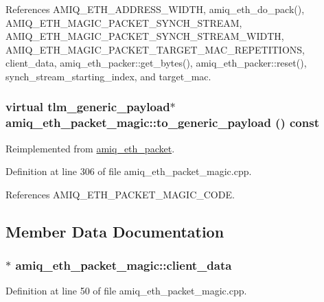 References AMIQ\_\-ETH\_\-ADDRESS\_\-WIDTH, amiq\_\-eth\_\-do\_\-pack(), AMIQ\_\-ETH\_\-MAGIC\_\-PACKET\_\-SYNCH\_\-STREAM, AMIQ\_\-ETH\_\-MAGIC\_\-PACKET\_\-SYNCH\_\-STREAM\_\-WIDTH, AMIQ\_\-ETH\_\-MAGIC\_\-PACKET\_\-TARGET\_\-MAC\_\-REPETITIONS, client\_\-data, amiq\_\-eth\_\-packer::get\_\-bytes(), amiq\_\-eth\_\-packer::reset(), synch\_\-stream\_\-starting\_\-index, and target\_\-mac.\hypertarget{classamiq__eth__packet__magic_adfe68e5b2702826b23d606caf90ab2bc}{
\subsubsection[{to\_\-generic\_\-payload}]{\setlength{\rightskip}{0pt plus 5cm}virtual tlm\_\-generic\_\-payload$\ast$ amiq\_\-eth\_\-packet\_\-magic::to\_\-generic\_\-payload () const}}
\label{classamiq__eth__packet__magic_adfe68e5b2702826b23d606caf90ab2bc}


Reimplemented from \hyperlink{classamiq__eth__packet_a6dd92751d8172eeaa347d71bb415b0d5}{amiq\_\-eth\_\-packet}.

Definition at line 306 of file amiq\_\-eth\_\-packet\_\-magic.cpp.

References AMIQ\_\-ETH\_\-PACKET\_\-MAGIC\_\-CODE.

\subsection{Member Data Documentation}
\hypertarget{classamiq__eth__packet__magic_a1f725ceba2f857032fbae819b7af409f}{
\subsubsection[{client\_\-data}]{$\ast$ {\bf amiq\_\-eth\_\-packet\_\-magic::client\_\-data}}}
\label{classamiq__eth__packet__magic_a1f725ceba2f857032fbae819b7af409f}


Definition at line 50 of file amiq\_\-eth\_\-packet\_\-magic.cpp.


